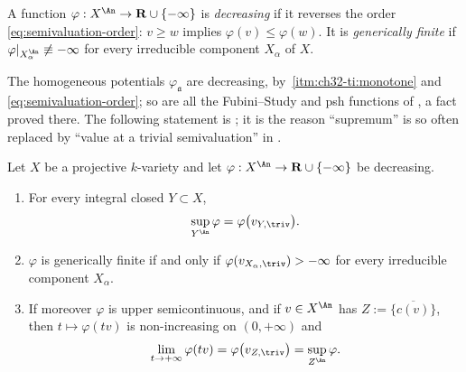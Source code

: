\begin{definition}
\label{def:ch32-decreasing}
A function $\varphi:X^{\An}\to\mathbf R\cup\{-\infty\}$ is
\emph{decreasing} if it reverses the order \eqref{eq:semivaluation-order}:
$v\geq w$ implies $\varphi(v)\leq\varphi(w)$.  It is
\emph{generically finite} if $\varphi|_{X_\alpha^{\An}}\not\equiv-\infty$
for every irreducible component $X_\alpha$ of $X$.
\end{definition}

The homogeneous potentials $\varphi_{\mathfrak a}$ are decreasing, by
\,\cref{itm:ch32-ti:monotone} and
\eqref{eq:semivaluation-order}; so are all the Fubini--Study and psh
functions of , a fact proved there.  The following
statement is \cite[Lemma~1.4]{BJ22}; it is the reason ``supremum'' is so
often replaced by ``value at a trivial semivaluation'' in .

\begin{proposition}
\label{prop:ch32-maximum-principle}
Let $X$ be a projective $k$-variety and let
$\varphi:X^{\An}\to\mathbf R\cup\{-\infty\}$ be decreasing.
\begin{enumerate}
\item\label{itm:ch32-mp:sup}
For every integral closed $Y\subset X$,
\begin{equation}
\label{eq:ch32-maximum-principle}
 \sup_{Y^{\An}}\varphi=\varphi\bigl(v_{Y,\triv}\bigr).
\end{equation}
\item\label{itm:ch32-mp:gf}
$\varphi$ is generically finite if and only if
$\varphi(v_{X_\alpha,\triv})>-\infty$ for every irreducible component
$X_\alpha$.
\item\label{itm:ch32-mp:usc}
If moreover $\varphi$ is upper semicontinuous, and if $v\in X^{\An}$ has
$Z:=\overline{\{c(v)\}}$, then $t\mapsto\varphi(tv)$ is
non-increasing on $(0,+\infty)$ and
\[
 \lim_{t\to+\infty}\varphi(tv)=\varphi\bigl(v_{Z,\triv}\bigr)
 =\sup_{Z^{\An}}\varphi .
\]
\end{enumerate}
\end{proposition}

